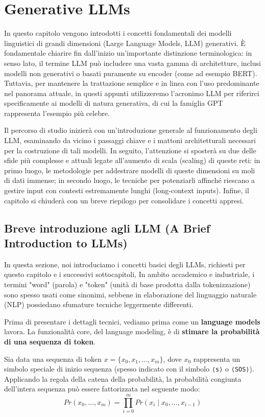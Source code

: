 \chapter{Generative LLMs}

In questo capitolo vengono introdotti i concetti fondamentali dei modelli linguistici di grandi dimensioni (Large Language Models, LLM) generativi. È fondamentale chiarire fin dall'inizio un'importante distinzione terminologica: in senso lato, il termine LLM può includere una vasta gamma di architetture, inclusi modelli non generativi o basati puramente su encoder (come ad esempio BERT). Tuttavia, per mantenere la trattazione semplice e in linea con l'uso predominante nel panorama attuale, in questi appunti utilizzeremo l'acronimo LLM per riferirci specificamente ai modelli di natura generativa, di cui la famiglia GPT rappresenta l'esempio più celebre.

Il percorso di studio inizierà con un'introduzione generale al funzionamento degli LLM, esaminando da vicino i passaggi chiave e i mattoni architetturali necessari per la costruzione di tali modelli. In seguito, l'attenzione si sposterà su due delle sfide più complesse e attuali legate all'aumento di scala (scaling) di queste reti: in primo luogo, le metodologie per addestrare modelli di queste dimensioni su moli di dati immense; in secondo luogo, le tecniche per potenziarli affinché riescano a gestire input con contesti estremamente lunghi (long-context inputs). Infine, il capitolo si chiuderà con un breve riepilogo per consolidare i concetti appresi.

\section{Breve introduzione agli LLM (A Brief Introduction to LLMs)}

In questa sezione, noi introduciamo i concetti basici degli LLMs, richiesti per questo capitolo e i successivi sottocapitoli,
In ambito accademico e industriale, i termini "word" (parola) e "token" (unità di base prodotta dalla tokenizzazione) sono spesso usati come sinonimi, sebbene in elaborazione del linguaggio naturale (NLP) possiedano sfumature tecniche leggermente differenti.

Prima di presentare i dettagli tecnici, vediamo prima come un \textbf{language models} lavora. La funzionalità core, del language modeling, è di \textbf{stimare la probabilità di una sequenza di token}.

Sia data una sequenza di token $x = \{x_0, x_1, \dots, x_m\}$, dove $x_0$ rappresenta un simbolo speciale di inizio sequenza (spesso indicato con il simbolo \texttt{⟨s⟩} o \texttt{⟨SOS⟩}). Applicando la regola della catena della probabilità, la probabilità congiunta dell'intera sequenza può essere fattorizzata nel seguente modo:
\begin{equation}
Pr(x_0, \dots, x_m)
=
\prod_{i=0}^{m} Pr(x_i \mid x_0, \dots, x_{i-1})
\end{equation}


